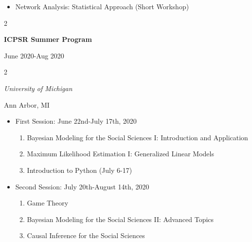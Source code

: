 \documentclass[
  16,
]{article}
\providecommand{\tightlist}{%
  \setlength{\itemsep}{0pt}\setlength{\parskip}{0pt}}
\begin{document}
\begin{itemize}
\tightlist
\item
  Network Analysis: Statistical Approach (Short Workshop)
\end{itemize}

\vspace{7pt}

\begin{multicols}{2}
    \begin{flushleft}{\bf ICPSR Summer Program}\end{flushleft}
    \begin{flushright}June 2020-Aug 2020\end{flushright}
  \end{multicols}
    \begin{multicols}{2}
    \begin{flushleft}{\it University of Michigan}\end{flushleft}
    \begin{flushright}Ann Arbor, MI\end{flushright}
  \end{multicols}
  \vspace{-0.17cm}

\begin{itemize}
\item
  First Session: June 22nd-July 17th, 2020

  \begin{enumerate}
  \def\labelenumi{\arabic{enumi}.}
  \tightlist
  \item
    Bayesian Modeling for the Social Sciences I: Introduction and
    Application
  \item
    Maximum Likelihood Estimation I: Generalized Linear Models
  \item
    Introduction to Python (July 6-17)
  \end{enumerate}
\item
  Second Session: July 20th-August 14th, 2020

  \begin{enumerate}
  \def\labelenumi{\arabic{enumi}.}
  \tightlist
  \item
    Game Theory
  \item
    Bayesian Modeling for the Social Sciences II: Advanced Topics
  \item
    Causal Inference for the Social Sciences
  \end{enumerate}
\end{itemize}
\end{document}
